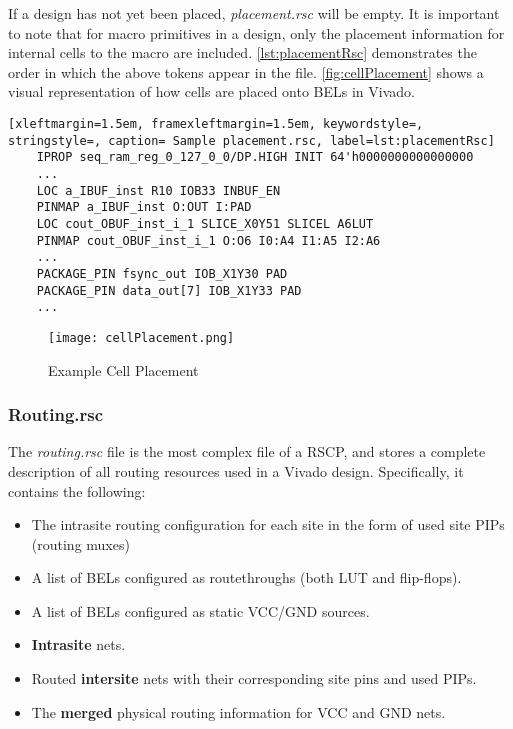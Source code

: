\noindent If a design has not yet been placed, \textit{placement.rsc} will be
empty. It is important to note that for macro primitives in a design, only the
placement information for internal cells to the macro are included.
\autoref{lst:placementRsc} demonstrates the order in which the above tokens
appear in the file. \autoref{fig:cellPlacement} shows a visual representation
of how cells are placed onto BELs in Vivado.

\begin{lstlisting}[xleftmargin=1.5em, framexleftmargin=1.5em, keywordstyle=,
stringstyle=, caption= Sample placement.rsc, label=lst:placementRsc]
	IPROP seq_ram_reg_0_127_0_0/DP.HIGH INIT 64'h0000000000000000
	...
	LOC a_IBUF_inst R10 IOB33 INBUF_EN
	PINMAP a_IBUF_inst O:OUT I:PAD
	LOC cout_OBUF_inst_i_1 SLICE_X0Y51 SLICEL A6LUT
	PINMAP cout_OBUF_inst_i_1 O:O6 I0:A4 I1:A5 I2:A6
	...
	PACKAGE_PIN fsync_out IOB_X1Y30 PAD
	PACKAGE_PIN data_out[7] IOB_X1Y33 PAD
	...  
\end{lstlisting}

\begin{figure}[h!]
  \centering
  \texttt{[image: cellPlacement.png]}
  \caption{Example Cell Placement}
  \label{fig:cellPlacement}
\end{figure}

\subsubsection{Routing.rsc} \label{sec:routingRsc}

The \textit{routing.rsc} file is the most complex file of a RSCP, and stores a
complete description of all routing resources used in a Vivado design.
Specifically, it contains the following:

\begin{itemize}
  \item The intrasite routing configuration for each site in the form of
  used site PIPs (routing muxes)
  \item A list of BELs configured as routethroughs (both LUT and flip-flops).
  \item A list of BELs configured as static VCC/GND sources. 
  \item \textbf{Intrasite} nets.
  \item Routed \textbf{intersite} nets with their corresponding site pins and
  used PIPs.
  \item The \textbf{merged} physical routing information for VCC and GND nets.
\end{itemize}


